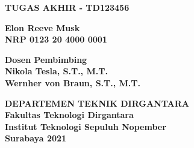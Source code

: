 \begin{flushleft}

  \sffamily\color{white}

  \noindent\textbf{TUGAS AKHIR - TD123456}
  \vspace{6ex}

  \vspace{4ex}

  \noindent\textbf{Elon Reeve Musk} \\
  \textbf{NRP 0123 20 4000 0001}
  \vspace{2ex}

  \noindent\textbf{Dosen Pembimbing} \\
  \textbf{Nikola Tesla, S.T., M.T.} \\
  \textbf{Wernher von Braun, S.T., M.T.}
  \vspace{6ex}

  \noindent\textbf{DEPARTEMEN TEKNIK DIRGANTARA} \\
  \textbf{Fakultas Teknologi Dirgantara} \\
  \textbf{Institut Teknologi Sepuluh Nopember} \\
  \textbf{Surabaya 2021}

\end{flushleft}

\restoregeometry